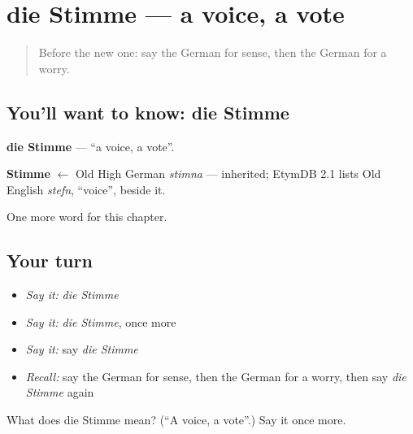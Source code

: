 \section[die Stimme]{die Stimme — a voice, a vote}

\label{lesson:GE-C238-stimme}



\begin{quote}
Before the new one: say the German for sense, then the German for a worry.
\end{quote}

\subsection*{You'll want to know: die Stimme}
\textbf{die Stimme} — \textquotedblleft{}a voice, a vote\textquotedblright{}.

\begin{cousinweb}
\textbf{Stimme} $\leftarrow$ Old High German \emph{stimna} — inherited; EtymDB 2.1 lists Old English \emph{stefn}, \textquotedblleft{}voice\textquotedblright{}, beside it.
\end{cousinweb}

\begin{grammarlens}[title={What you've built}]
One more word for this chapter.
\end{grammarlens}

\subsection*{Your turn}
\begin{itemize}
\raggedright
  \item \emph{Say it:} \emph{die Stimme}
  \item \emph{Say it:} \emph{die Stimme}, once more
  \item \emph{Say it:} say \emph{die Stimme}
  \item \emph{Recall:} say the German for sense, then the German for a worry, then say \emph{die Stimme} again
\end{itemize}

\begin{tcolorbox}[breakable,colback=teal!4,colframe=teal!35!black,title={Before you move on}]
What does die Stimme mean? (\textquotedblleft{}A voice, a vote\textquotedblright{}.) Say it once more.
\end{tcolorbox}
